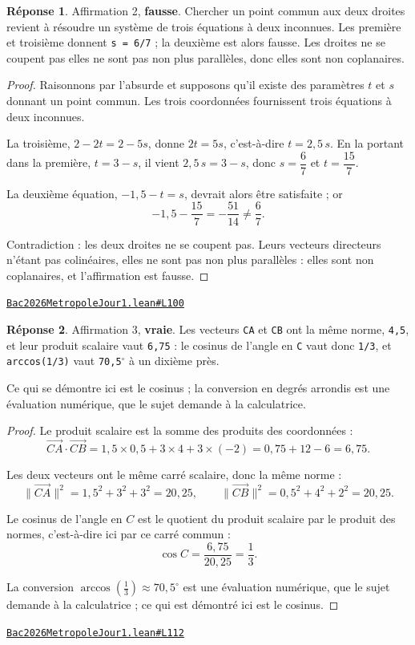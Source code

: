 \documentclass[11pt,a4paper]{article}
\theoremstyle{definition}
\theoremstyle{plain}
\theoremstyle{definition}
\newtheorem*{reponse}{Réponse}
\newcommand{\source}[2]{\par\smallskip\noindent\hfill{\footnotesize\href{#1}{\texttt{#2}}}\par\smallskip}
\begin{document}
\begin{reponse}
Affirmation 2, \textbf{fausse}. Chercher un point commun aux deux droites revient à
résoudre un système de trois équations à deux inconnues. Les première et troisième
donnent \texttt{s = 6/7} ; la deuxième est alors fausse. Les droites ne se coupent pas \textemdash{}
elles ne sont pas non plus parallèles, donc elles sont non coplanaires.
\end{reponse}
\begin{proof}
Raisonnons par l'absurde et supposons qu'il existe des paramètres $t$ et $s$ donnant un
point commun. Les trois coordonnées fournissent trois équations à deux inconnues.

La troisième, $2 - 2t = 2 - 5s$, donne $2t = 5s$, c'est-à-dire $t = 2{,}5\,s$. En la
portant dans la première, $t = 3 - s$, il vient $2{,}5\,s = 3 - s$, donc $s = \dfrac{6}{7}$
et $t = \dfrac{15}{7}$.

La deuxième équation, $-1{,}5 - t = s$, devrait alors être satisfaite ; or
\[ -1{,}5 - \frac{15}{7} = -\frac{51}{14} \ne \frac{6}{7} . \]

Contradiction : les deux droites ne se coupent pas. Leurs vecteurs directeurs n'étant pas
colinéaires, elles ne sont pas non plus parallèles : elles sont non coplanaires, et
l'affirmation est fausse.
\end{proof}
\source{https://github.com/Commutator-IO/learn-lean/blob/main/exams/2026/Bac2026MetropoleJour1.lean\#L100}{Bac2026MetropoleJour1.lean\#L100}

\begin{reponse}
Affirmation 3, \textbf{vraie}. Les vecteurs \texttt{CA} et \texttt{CB} ont la même norme, \texttt{4,5}, et
leur produit scalaire vaut \texttt{6,75} : le cosinus de l'angle en \texttt{C} vaut donc \texttt{1/3}, et
\texttt{arccos(1/3)} vaut \texttt{70,5\(^\circ\)} à un dixième près.

Ce qui se démontre ici est le cosinus ; la conversion en degrés arrondis est une
évaluation numérique, que le sujet demande à la calculatrice.
\end{reponse}
\begin{proof}
Le produit scalaire est la somme des produits des coordonnées :
\[ \vec{CA} \cdot \vec{CB} = 1{,}5 \times 0{,}5 + 3 \times 4 + 3 \times (-2)
   = 0{,}75 + 12 - 6 = 6{,}75 . \]

Les deux vecteurs ont le même carré scalaire, donc la même norme :
\[ \|\vec{CA}\|^2 = 1{,}5^2 + 3^2 + 3^2 = 20{,}25 , \qquad
   \|\vec{CB}\|^2 = 0{,}5^2 + 4^2 + 2^2 = 20{,}25 . \]

Le cosinus de l'angle en $C$ est le quotient du produit scalaire par le produit des
normes, c'est-à-dire ici par ce carré commun :
\[ \cos \widehat{C} = \frac{6{,}75}{20{,}25} = \frac{1}{3} . \]

La conversion $\arccos\left(\tfrac{1}{3}\right) \approx 70{,}5^\circ$ est une évaluation
numérique, que le sujet demande à la calculatrice ; ce qui est démontré ici est le cosinus.
\end{proof}
\source{https://github.com/Commutator-IO/learn-lean/blob/main/exams/2026/Bac2026MetropoleJour1.lean\#L112}{Bac2026MetropoleJour1.lean\#L112}
\end{document}
